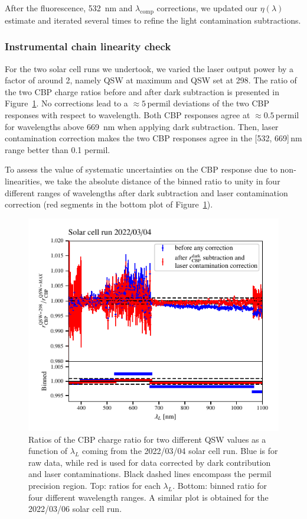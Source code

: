 After the fluorescence, \SI{532}{\nano\meter} and $\lambda_{\mathrm{comp}}$ corrections, we updated our $\eta(\lambda)$ estimate and iterated several times to refine the light contamination subtractions.


\subsubsection{Instrumental chain linearity check}\label{sec:sc_linearity}
For the two solar cell runs we undertook, we varied the laser output power by a factor of around 2, namely QSW at maximum and QSW set at 298. The ratio of the two CBP charge ratios before and after dark subtraction is presented in Figure~\ref{fig:SCqswlinearity}. No corrections lead to a $\approx 5\,$permil deviations of the two CBP responses with respect to wavelength. Both CBP responses agree at $\approx 0.5\,$permil for wavelengths above \SI{669}{\nano\meter} when applying dark subtraction. Then, laser contamination correction makes the two CBP responses agree in the [532, 669]\,nm range better than 0.1 permil.

To assess the value of systematic uncertainties on the CBP response due to non-linearities, we take the absolute distance of the binned ratio to unity in four different ranges of wavelengths after dark subtraction and laser contamination correction (red segments in the bottom plot of Figure~\ref{fig:SCqswlinearity}).

\begin{figure}[h]
    \centering
    \includegraphics[width=\columnwidth]{fig/sc_qsw_ratios.pdf}
    \caption{Ratios of the CBP charge ratio for two different QSW values as a function of $\lambda_L$ coming from the 2022/03/04 solar cell run. Blue is for raw data, while red is used for data corrected by dark contribution and laser contaminations. Black dashed lines encompass the permil precision region. Top: ratios for each $\lambda_L$. Bottom: binned ratio for four different wavelength ranges. A similar plot is obtained for the 2022/03/06 solar cell run.}
    \label{fig:SCqswlinearity}    
\end{figure}



